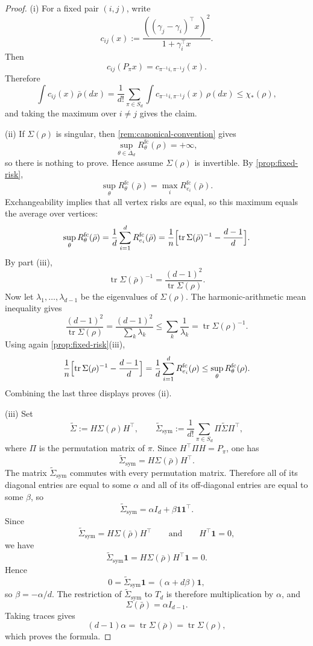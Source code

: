 \documentclass[11pt]{amsart}
\theoremstyle{definition}
\DeclareMathOperator{\tr}{tr}
\newcommand{\one}{\mathbf 1}
\begin{document}
\begin{proof}
(i) For a fixed pair $(i,j)$, write
\[
c_{ij}(x):=\frac{((\gamma_j-\gamma_i)^\top x)^2}{1+\gamma_i^\top x}.
\]
Then
\[
c_{ij}(P_\pi x)=c_{\pi^{-1}i,\pi^{-1}j}(x).
\]
Therefore
\[
\int c_{ij}(x)\,\bar\rho(dx)=\frac1{d!}\sum_{\pi\in S_d}\int c_{\pi^{-1}i,\pi^{-1}j}(x)\,\rho(dx)\le \chi_*(\rho),
\]
and taking the maximum over $i\neq j$ gives the claim.

(ii) If $\Sigma(\rho)$ is singular, then \cref{rem:canonical-convention} gives
\[
\sup_{\theta\in\Delta_d}R^{\mathrm{fc}}_\theta(\rho)=+\infty,
\]
so there is nothing to prove. Hence assume $\Sigma(\rho)$ is invertible. By \cref{prop:fixed-risk},
\[
\sup_{\theta}R^{\mathrm{fc}}_\theta(\bar\rho)=\max_i R^{\mathrm{fc}}_{e_i}(\bar\rho).
\]
Exchangeability implies that all vertex risks are equal, so this maximum equals the average over vertices:
\[
\sup_{\theta}R^{\mathrm{fc}}_\theta(\bar\rho)=\frac1d\sum_{i=1}^d R^{\mathrm{fc}}_{e_i}(\bar\rho)=\frac1n\Bigl[\tr\Sigma(\bar\rho)^{-1}-\frac{d-1}{d}\Bigr].
\]
By part (iii),
\[
\tr\Sigma(\bar\rho)^{-1}=\frac{(d-1)^2}{\tr\Sigma(\rho)}.
\]
Now let $\lambda_1,\dots,\lambda_{d-1}$ be the eigenvalues of $\Sigma(\rho)$. The harmonic-arithmetic mean inequality gives
\[
\frac{(d-1)^2}{\tr\Sigma(\rho)}=\frac{(d-1)^2}{\sum_k \lambda_k}\le \sum_k \frac{1}{\lambda_k}=\tr\Sigma(\rho)^{-1}.
\]
Using again \cref{prop:fixed-risk}(iii),
\[
\frac1n\Bigl[\tr\Sigma(\rho)^{-1}-\frac{d-1}{d}\Bigr]=\frac1d\sum_{i=1}^d R^{\mathrm{fc}}_{e_i}(\rho)\le \sup_\theta R^{\mathrm{fc}}_\theta(\rho).
\]
Combining the last three displays proves (ii).

(iii) Set
\[
\widetilde\Sigma:=H\Sigma(\rho)H^\top,
\qquad
\widetilde\Sigma_{\mathrm{sym}}:=\frac1{d!}\sum_{\pi\in S_d}\Pi \widetilde\Sigma \Pi^\top,
\]
where $\Pi$ is the permutation matrix of $\pi$. Since $H^\top \Pi H=P_\pi$, one has
\[
\widetilde\Sigma_{\mathrm{sym}}=H\Sigma(\bar\rho)H^\top.
\]
The matrix $\widetilde\Sigma_{\mathrm{sym}}$ commutes with every permutation matrix. Therefore all of its diagonal entries are equal to some $\alpha$ and all of its off-diagonal entries are equal to some $\beta$, so
\[
\widetilde\Sigma_{\mathrm{sym}}=\alpha I_d+\beta \one\one^\top.
\]
Since
\[
\widetilde\Sigma_{\mathrm{sym}}=H\Sigma(\bar\rho)H^\top
\qquad\text{and}\qquad
H^\top\one=0,
\]
we have
\[
\widetilde\Sigma_{\mathrm{sym}}\one=H\Sigma(\bar\rho)H^\top\one=0.
\]
Hence
\[
0=\widetilde\Sigma_{\mathrm{sym}}\one=(\alpha+d\beta)\one,
\]
so $\beta=-\alpha/d$. The restriction of $\widetilde\Sigma_{\mathrm{sym}}$ to $T_d$ is therefore multiplication by $\alpha$, and
\[
\Sigma(\bar\rho)=\alpha I_{d-1}.
\]
Taking traces gives
\[
(d-1)\alpha=\tr\Sigma(\bar\rho)=\tr\Sigma(\rho),
\]
which proves the formula.
\end{proof}
\end{document}
